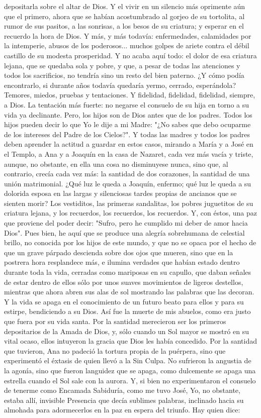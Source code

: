 \documentclass[12pt]{book} %
\begin{document}
depositarla sobre el altar de Dios. Y el vivir en un silencio más oprimente aún que el primero, ahora que se habían acostumbrado al gorjeo de su tortolita, al rumor de sus pasitos, a las sonrisas, a los besos de su criatura; y esperar en el recuerdo la hora de Dios. Y más, y más todavía: enfermedades, calamidades por la intemperie, abusos de los poderosos... muchos golpes de ariete contra el débil castillo de su modesta prosperidad. Y no acaba aquí todo: el dolor de esa criatura lejana, que se quedaba sola y pobre, y que, a pesar de todas las atenciones y todos los sacrificios, no tendría sino un resto del bien paterno. ¿Y cómo podía encontrarlo, si durante años todavía quedaría yermo, cerrado, esperándola? Temores, miedos, pruebas y tentaciones. Y fidelidad, fidelidad, fidelidad, siempre, a Dios. La tentación más fuerte: no negarse el consuelo de su hija en torno a su vida ya declinante. Pero, los hijos son de Dios antes que de los padres. Todos los hijos pueden decir lo que Yo le dije a mi Madre: "¿No sabes que debo ocuparme de los intereses del Padre de los Cielos?". Y todas las madres y todos los padres deben aprender la actitud a guardar en estos casos, mirando a María y a José en el Templo, a Ana y a Joaquín en la casa de Nazaret, cada vez más vacía y triste, aunque, no obstante, en ella una cosa no disminuyese nunca, sino que, al contrario, crecía cada vez más: la santidad de dos corazones, la santidad de una unión matrimonial. ¿Qué luz le queda a Joaquín, enfermo; qué luz le queda a su dolorida esposa en las largas y silenciosas tardes propias de ancianos que se sienten morir? Los vestiditos, las primeras sandalitas, los pobres juguetitos de su criatura lejana, y los recuerdos, los recuerdos, los recuerdos. Y, con éstos, una paz que proviene del poder decir: "Sufro, pero he cumplido mi deber de amor hacia Dios". Pues bien, he aquí que se produce una alegría sobrehumana de celestial brillo, no conocida por los hijos de este mundo, y que no se opaca por el hecho de que un grave párpado descienda sobre dos ojos que mueren, sino que en la postrera hora resplandece más, e ilumina verdades que habían estado dentro durante toda la vida, cerradas como mariposas en su capullo, que daban señales de estar dentro de ellos sólo por unos suaves movimientos de ligeros destellos, mientras que ahora abren sus alas de sol mostrando las palabras que las decoran. Y la vida se apaga en el conocimiento de un futuro beato para ellos y para su estirpe, bendiciendo a su Dios. Así fue la muerte de mis abuelos, como era justo que fuera por su vida santa. Por la santidad merecieron ser los primeros depositarios de la Amada de Dios, y, sólo cuando un Sol mayor se mostró en su vital ocaso, ellos intuyeron la gracia que Dios les había concedido. Por la santidad que tuvieron, Ana no padeció la tortura propia de la puérpera, sino que experimentó el éxtasis de quien llevó a la Sin Culpa. No sufrieron la angustia de la agonía, sino que fueron languidez que se apaga, como dulcemente se apaga una estrella cuando el Sol sale con la aurora. Y, si bien no experimentaron el consuelo de tenerme como Encamada Sabiduría, como me tuvo José, Yo, no obstante, estaba allí, invisible Presencia que decía sublimes palabras, inclinado hacia su almohada para adormecerlos en la paz en espera del triunfo. Hay quien dice: 
\end{document}
